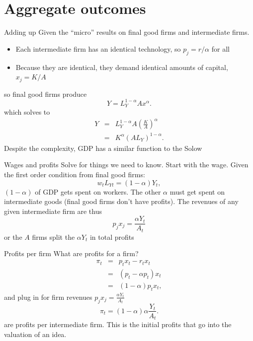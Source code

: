 \section{Aggregate outcomes}
\begin{frame}{Adding up}
Given the ``micro'' results on final good firms and intermediate firms.
\begin{itemize}
	\item Each intermediate firm has an identical technology, so $p_j = r/\alpha$ for all
	\item Because they are identical, they demand identical amounts of capital, $x_j = K/A$
\end{itemize}
so final good firms produce
\begin{equation}
	Y = L_Y^{1-\alpha} A x^{\alpha}.
\end{equation}
which solves to
\begin{eqnarray}
	Y &=& L_Y^{1-\alpha} A \left(\frac{K}{A} \right)^{\alpha} \nonumber \\ 
	  &=& K^{\alpha} (AL_Y)^{1-\alpha}.
\end{eqnarray}
Despite the complexity, GDP has a similar function to the Solow
\end{frame}

\begin{frame}{Wages and profits}
Solve for things we need to know. Start with the wage. Given the first order condition from final good firms:
\begin{equation}
	w_t L_{Yt} = (1-\alpha)Y_t, \nonumber
\end{equation}
$(1-\alpha)$ of GDP gets spent on workers. The other $\alpha$ must get spent on intermediate goods (final good firms don't have profits). The revenues of any given intermediate firm are thus
\begin{equation}
	p_j x_j = \frac{\alpha Y_t}{A_t}
\end{equation}
or the $A$ firms split the $\alpha Y_t$ in total profits
\end{frame}

\begin{frame}{Profits per firm}
What are profits for a firm?
\begin{eqnarray}
	\pi_t &=& p_t x_t - r_t x_t \nonumber \\
	      &=& (p_t - \alpha p_t) x_t \nonumber \\
	      &=& (1-\alpha) p_t x_t, \nonumber
\end{eqnarray}
and plug in for firm revenues $p_j x_j = \frac{\alpha Y_t}{A_t}$
\begin{equation}
	\pi_t = (1-\alpha) \alpha \frac{Y_t}{A_t}.\label{EQ_pi_j}
\end{equation}
are profits per intermediate firm. This is the initial profits that go into the valuation of an idea.
\end{frame}

